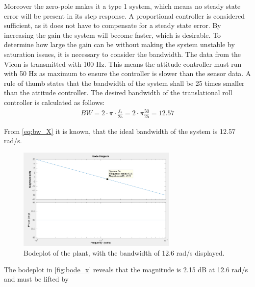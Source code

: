 Moreover the zero-pole makes it a type 1 system, which means no steady state error will be present in its step response. 
A proportional controller is considered sufficient, as it does not have to compensate for a steady state error. By increasing the gain the system will become faster, which is desirable. To determine how large the gain can be without making the system unstable by saturation issues, it is necessary to consider the bandwidth. \newpar
The data from the Vicon is transmitted with 100 Hz. This means the attitude controller must run with 50 Hz as maximum to ensure the controller is slower than the sensor data. A rule of thumb states that the bandwidth of the system shall be 25 times smaller than the attitude controller. The desired bandwidth of the translational roll controller is calculated as follows:
\begin{align}
BW=2\cdot \pi\cdot \frac{f_s}{25}=2\cdot \pi \frac{50}{25}=12.57\label{eq:bw_X}
\end{align}
\begin{where}
\end{where}

From \autoref{eq:bw_X} it is known, that the ideal bandwidth of the system is 12.57 rad/s. 
\begin{figure}[H]
	\centering
	\includegraphics[width=0.7\textwidth]{figures/bode_x.png}
	\caption{Bodeplot of the plant, with the bandwidth of 12.6 rad/s displayed.}\label{fig:bode_x}
\end{figure}
The bodeplot in \autoref{fig:bode_x} reveals that the magnitude is 2.15 dB at 12.6 rad/s and must be lifted by 

